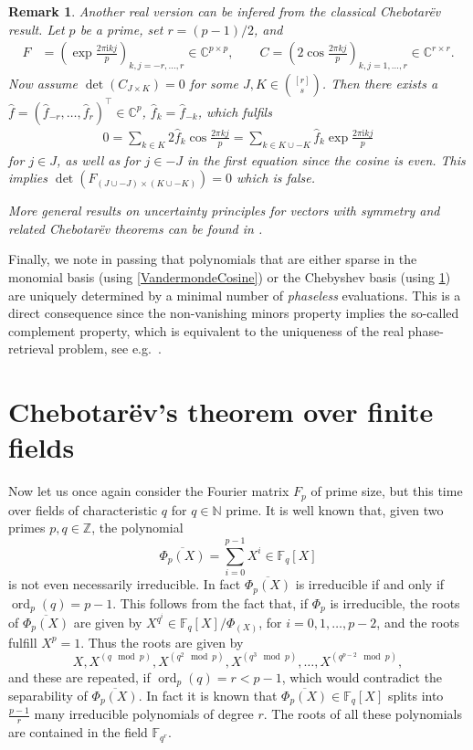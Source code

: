 \documentclass[a4paper]{article}
\newcommand{\N}{\ensuremath{\mathbb{N}}}
\newcommand{\Z}{\ensuremath{\mathbb{Z}}}
\newcommand{\C}{\ensuremath{\mathbb{C}}}
\newcommand{\F}{\mathbb{F}}
\newcommand{\ord}{\operatorname{ord}}
\newtheorem{remark}[theorem]{Remark}
\numberwithin{equation}{section}
\numberwithin{table}{section}
\numberwithin{figure}{section}
\begin{document}
\begin{remark}\label{rem:Cos}
 Another real version can be infered from the classical Chebotar\"ev result.
    Let $p$ be a prime, set $r=(p-1)/2$, and
\begin{align*}
    F&=\left(\exp\frac{2\pi \mathrm{i} kj}{p}\right)_{k,j=-r,\hdots,r}\in\C^{p\times p},
    \qquad
    C%
    =\left(2\cos\frac{2\pi kj}{p}\right)_{k,j=1,\hdots,r}\in\C^{r\times r}.
\end{align*}
Now assume $\det(C_{J\times K})=0$ for some $J,K\in\binom{[r]}{s}$.
Then there exists a $\hat f=(\hat f_{-r},\hdots,\hat f_r)^{\top} \in\C^p$, $\hat f_k=\hat f_{-k}$, which fulfils 
\begin{align*}
 0=\sum_{k\in K} 2\hat f_k \cos\frac{2\pi kj}{p} = \sum_{k\in K\cup -K} \hat f_k \exp\frac{2\pi\mathrm{i} kj}{p}
\end{align*}
for $j\in J$, as well as for $j\in -J$ in the first equation since the cosine is even.
This implies $\det(F_{(J\cup -J)\times (K\cup -K)})=0$ which is false.

More general results on uncertainty principles for vectors with symmetry and related Chebotar\"ev theorems can be found in \cite{GaKaKa21}.
\end{remark}

Finally, we note in passing that polynomials that are either sparse in the monomial basis (using \cref{VandermondeCosine}) or the Chebyshev basis (using \cref{rem:Cos}) are uniquely determined by a minimal number of \emph{phaseless} evaluations. This is a direct consequence since the non-vanishing minors property implies the so-called complement property, which is equivalent to the uniqueness of the real phase-retrieval problem, see e.g.~\cite{BaCaEd06,BeEd22}.

\section{Chebotar\"ev's theorem over finite fields}\label{sec:finitefields}
Now let us once again consider the Fourier matrix $F_p$ of prime size, but this time over fields of characteristic $q$ for $q \in \N$ prime.
It is well known that, given two primes $p,q \in \Z$, the polynomial
\[
\overline{\Phi_p(X)}=\sum_{i=0}^{p-1}X^i \in \F_q[X]
\]
is not even necessarily irreducible. In fact $\overline{\Phi_p(X)}$ is irreducible if and only if $\ord_p(q)=p-1$.
This follows from the fact that, if $\Phi_p$ is irreducible, the roots of $\overline{\Phi_p(X)}$ are given by $X^{q^i} \in \F_q[X]/\Phi_(X)$, for $i=0,1,\ldots,p-2$, and the roots fulfill $X^p=1$. Thus the roots are given by
\[
X,X^{(q \mod p)},X^{(q^2 \mod p)},X^{(q^3 \mod p)},\ldots,X^{(q^{p-2} \mod p)},
\]
and these are repeated, if $\ord_p(q)=r< p-1$, which would contradict the separability of $\overline{\Phi_p(X)}$. In fact it is known that $\overline{\Phi_p(X)} \in \F_q[X]$ splits into $\frac{p-1}{r}$ many irreducible polynomials of degree $r$. The roots of all these polynomials are contained in the field $\F_{q^r}$.
\end{document}
